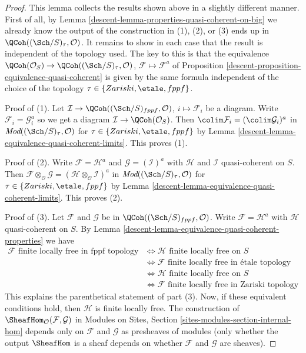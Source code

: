 \begin{proof}

This lemma collects the results shown above in a slightly different manner.
First of all, by Lemma \ref{descent-lemma-properties-quasi-coherent-on-big}
we already know the output of the construction in (1), (2), or (3)
ends up in $\QCoh((\Sch/S)_\tau, \mathcal{O})$.
It remains to show in each case that the result is
independent of the topology used. The key to this is that the equivalence
$\QCoh(\mathcal{O}_S) \to \QCoh((\Sch/S)_\tau, \mathcal{O})$,
$\mathcal{F} \mapsto \mathcal{F}^a$
of Proposition \ref{descent-proposition-equivalence-quasi-coherent}
is given by the same formula independent of the choice
of the topology $\tau \in \{Zariski, \etale, fppf\}$.

\medskip\noindent
Proof of (1). Let $\mathcal{I} \to \QCoh((\Sch/S)_{fppf}, \mathcal{O})$,
$i \mapsto \mathcal{F}_i$ be a diagram. Write
$\mathcal{F}_i = \mathcal{G}_i^a$ so we get a diagram
$\mathcal{I} \to \QCoh(\mathcal{O}_S)$.
Then $\colim \mathcal{F}_i = (\colim \mathcal{G}_i)^a$ in
$\textit{Mod}((\Sch/S)_\tau, \mathcal{O})$ for
$\tau \in \{Zariski, \etale, fppf\}$
by Lemma \ref{descent-lemma-equivalence-quasi-coherent-limits}.
This proves (1).

\medskip\noindent
Proof of (2). Write $\mathcal{F} = \mathcal{H}^a$ and
$\mathcal{G} = (\mathcal{I})^a$ with $\mathcal{H}$ and $\mathcal{I}$
quasi-coherent on $S$. Then
$\mathcal{F} \otimes_\mathcal{O} \mathcal{G} =
(\mathcal{H} \otimes_\mathcal{O} \mathcal{I})^a$ in
$\textit{Mod}((\Sch/S)_\tau, \mathcal{O})$ for
$\tau \in \{Zariski, \etale, fppf\}$
by Lemma \ref{descent-lemma-equivalence-quasi-coherent-limits}.
This proves (2).

\medskip\noindent
Proof of (3). Let $\mathcal{F}$ and $\mathcal{G}$ be in
$\QCoh((\Sch/S)_{fppf}, \mathcal{O})$. Write
$\mathcal{F} = \mathcal{H}^a$ with $\mathcal{H}$
quasi-coherent on $S$. By
Lemma \ref{descent-lemma-equivalence-quasi-coherent-properties} we have
\begin{align*}
\mathcal{F}\text{ finite locally free in fppf topology}
& \Leftrightarrow
\mathcal{H}\text{ finite locally free on }S \\
& \Leftrightarrow
\mathcal{F}\text{ finite locally free in \'etale topology} \\
& \Leftrightarrow
\mathcal{H}\text{ finite locally free on }S \\
& \Leftrightarrow
\mathcal{F}\text{ finite locally free in Zariski topology}
\end{align*}
This explains the parenthetical statement of part (3).
Now, if these equivalent conditions hold, then $\mathcal{H}$
is finite locally free. The construction of
$\SheafHom_\mathcal{O}(\mathcal{F}, \mathcal{G})$ in
Modules on Sites, Section \ref{sites-modules-section-internal-hom}
depends only on $\mathcal{F}$ and $\mathcal{G}$ as presheaves
of modules (only whether the output $\SheafHom$ is
a sheaf depends on whether $\mathcal{F}$ and $\mathcal{G}$ are
sheaves).
\end{proof}

